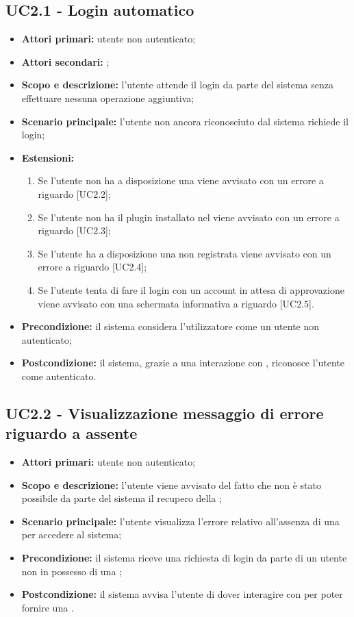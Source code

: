 \documentclass[AnalisiDeiRequisiti.tex]{subfiles}
\begin{document}
\subsection{UC2.1 - Login automatico}
\begin{itemize}
\item \textbf{Attori primari:} utente non autenticato;
\item \textbf{Attori secondari:} ;
\item \textbf{Scopo e descrizione:} l'utente attende il login da parte del sistema senza effettuare nessuna operazione aggiuntiva;
\item \textbf{Scenario principale:} l'utente non ancora riconosciuto dal sistema richiede il login;
\item \textbf{Estensioni:}
\begin{enumerate}
	\item Se l'utente non ha a disposizione una  viene avvisato con un errore a riguardo [UC2.2];
	\item Se l'utente non ha il plugin  installato nel  viene avvisato con un errore a riguardo [UC2.3];
	\item Se l'utente ha a disposizione una  non registrata viene avvisato con un errore a riguardo [UC2.4];
	\item Se l'utente tenta di fare il login con un account in attesa di approvazione viene avvisato con una schermata informativa a riguardo [UC2.5].
\end{enumerate}
\item \textbf{Precondizione:} il sistema considera l'utilizzatore come un utente non autenticato;
\item \textbf{Postcondizione:} il sistema, grazie a una interazione con , riconosce l'utente come autenticato.
\end{itemize}
\subsection{UC2.2 - Visualizzazione messaggio di errore riguardo a  assente}
\begin{itemize}
	\item \textbf{Attori primari:} utente non autenticato;
	\item \textbf{Scopo e descrizione:} l'utente viene avvisato del fatto che non è stato possibile da parte del sistema il recupero della ;
	\item \textbf{Scenario principale:} l'utente visualizza l'errore relativo all'assenza di una  per accedere al sistema;
	\item \textbf{Precondizione:} il sistema riceve una richiesta di login da parte di un utente non in possesso di una ;
	\item \textbf{Postcondizione:} il sistema avvisa l'utente di dover interagire con  per poter fornire una .
\end{itemize}
\end{document}
